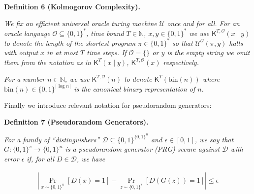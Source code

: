 

\par\medskip\noindent\textbf{
\textbf{Definition 6}\textbf{ }(Kolmogorov Complexity)\textbf{.}
}\par



\emph{We fix an efficient universal oracle turing machine $\mathcal{U}$ once and for all. For an oracle language $\mathcal{O}\subseteq\{0,1\}^{*}$, time bound $T\in\mathbb{N}$, $x,y\in\{0,1\}^{*}$ we use ${\mathsf{K}}^{T,\mathcal{O}}(x\mid y)$ to denote the length of the shortest program $\pi\in\{0,1\}^{*}$ so that $\mathcal{U}^{\mathcal{O}}(\pi,y)$ halts with output $x$ in at most $T$ time steps. If $\mathcal{O}=\{\}$ or $y$ is the empty string we omit them from the notation as in ${\mathsf{K}}^{T}(x\mid y)$, ${\mathsf{K}}^{T,\mathcal{O}}(x)$ respectively.}\par




\emph{For a number $n\in\mathbb{N}$, we use ${\mathsf{K}}^{T,\mathcal{O}}(n)$ to denote ${\mathsf{K}}^{T}(\mathrm{bin}(n))$ where $\mathrm{bin}(n)\in\{0,1\}^{\lceil\log n\rceil}$ is the canonical binary representation of $n$.}\par






Finally we introduce relevant notation for pseudorandom generators:\par





\par\medskip\noindent\textbf{
\textbf{Definition 7}\textbf{ }(Pseudorandom Generators)\textbf{.}
}\par



\emph{For a family of “distinguishers” $\mathcal{D}\subseteq\{0,1\}^{\{0,1\}^{n}}$ and $\epsilon\in[0,1]$, we say that $G:\{0,1\}^{s}\to\{0,1\}^{n}$ is a pseudorandom generator (PRG) secure against $\mathcal{D}$ with error $\epsilon$ if, for all $D\in\mathcal{D}$, we have}\par


\[\begin{gathered}
|\Pr_{x\sim\{0,1\}^{n}}[D(x)=1]-\Pr_{z\sim\{0,1\}^{s}}[D(G(z))=1]|\leq\epsilon
\end{gathered}\]



